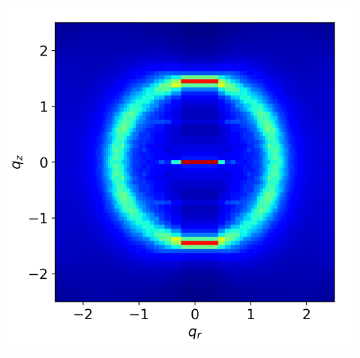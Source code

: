 \documentclass{article}
\begin{document}
\begin{figure}
\begin{subfigure}{0.3\linewidth}
        \caption{}~\label{fig:raw_waxs}
  \end{subfigure}
  \begin{subfigure}{0.3\linewidth}
        \centering
        \includegraphics[width=\linewidth]{offset_rzplot.png}
        \caption{}~\label{fig:rz_offset}
  \end{subfigure}
  \begin{subfigure}{0.0544\linewidth}
        \centering
        \vspace{-3.30em}

\end{subfigure}
\end{figure}
\end{document}

